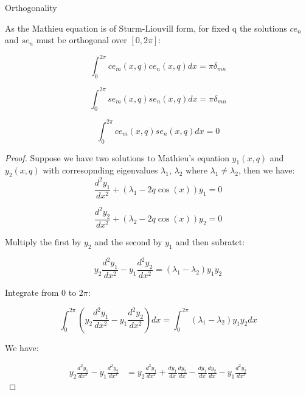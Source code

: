 \documentclass{article}
\begin{document}
Orthogonality

As the Mathieu equation is of Sturm-Liouvill form, for fixed q the solutions $ce_n$ and $se_n$ must be orthogonal over $[0, 2\pi]$:

\begin{equation}
    \int_0^{2\pi}ce_m(x, q)ce_n(x, q)dx = \pi \delta_{mn}
\end{equation}

\begin{equation}
    \int_0^{2\pi}se_m(x, q)se_n(x, q)dx = \pi \delta_{mn}
\end{equation}

\begin{equation}
    \int_0^{2\pi}ce_m(x, q)se_n(x, q)dx = 0
\end{equation}

\begin{proof}
    Suppose we have two solutions to Mathieu's equation $y_1(x, q)$ and $y_2(x, q)$ with corresopnding eigenvalues $\lambda_1$, $\lambda_2$ where $\lambda_1 \neq \lambda_2$, then we have:
    \begin{equation}
        \frac{d^2 y_1}{dx^2} + (\lambda_1 - 2 q \cos(x)) y_1 = 0
    \end{equation}

    \begin{equation}
        \frac{d^2 y_2}{dx^2} + (\lambda_2 - 2 q \cos(x)) y_2 = 0
    \end{equation}

    Multiply the first by $y_2$ and the second by $y_1$ and then subratct:

    \begin{equation}
        y_2 \frac{d^2 y_1}{dx^2} - y_1 \frac{d^2 y_2}{dx^2} = (\lambda_1 - \lambda_2) y_1 y_2
    \end{equation}

    Integrate from $0$ to $2\pi$:

    \begin{equation}
        \int_{0}^{2\pi} \left( y_2 \frac{d^2y_1}{dx^2} - y_1 \frac{d^2y_2}{dx^2} \right) dx = \int_{0}^{2\pi} (\lambda_1 - \lambda_2) y_1 y_2 dx
    \end{equation}

    We have:

        \begin{align}
            y_2 \frac{d^2y_1}{dx^2} - y_1 \frac{d^2y_2}{dx^2} & = y_2 \frac{d^2y_1}{dx^2} + \frac{dy_1}{dx} \frac{dy_2}{dx} - \frac{dy_1}{dx} \frac{dy_2}{dx} - y_1 \frac{d^2y_2}{dx^2} 
        \end{align}

\end{proof}
\end{document}
